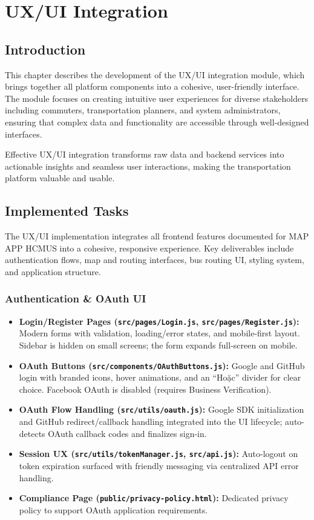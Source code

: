 \chapter{UX/UI Integration}
\label{chap:uxui-integration}

\section{Introduction}

This chapter describes the development of the UX/UI integration module, which brings together all platform components into a cohesive, user-friendly interface. The module focuses on creating intuitive user experiences for diverse stakeholders including commuters, transportation planners, and system administrators, ensuring that complex data and functionality are accessible through well-designed interfaces.

Effective UX/UI integration transforms raw data and backend services into actionable insights and seamless user interactions, making the transportation platform valuable and usable.

\section{Implemented Tasks}

The UX/UI implementation integrates all frontend features documented for MAP APP HCMUS into a cohesive, responsive experience. Key deliverables include authentication flows, map and routing interfaces, bus routing UI, styling system, and application structure.

\subsection{Authentication \& OAuth UI}
\begin{itemize}
    \item \textbf{Login/Register Pages (\texttt{src/pages/Login.js}, \texttt{src/pages/Register.js}):} Modern forms with validation, loading/error states, and mobile-first layout. Sidebar is hidden on small screens; the form expands full-screen on mobile.
    \item \textbf{OAuth Buttons (\texttt{src/components/OAuthButtons.js}):} Google and GitHub login with branded icons, hover animations, and an ``Hoặc'' divider for clear choice. Facebook OAuth is disabled (requires Business Verification).
    \item \textbf{OAuth Flow Handling (\texttt{src/utils/oauth.js}):} Google SDK initialization and GitHub redirect/callback handling integrated into the UI lifecycle; auto-detects OAuth callback codes and finalizes sign-in.
    \item \textbf{Session UX (\texttt{src/utils/tokenManager.js}, \texttt{src/api.js}):} Auto-logout on token expiration surfaced with friendly messaging via centralized API error handling.
    \item \textbf{Compliance Page (\texttt{public/privacy-policy.html}):} Dedicated privacy policy to support OAuth application requirements.
\end{itemize}


